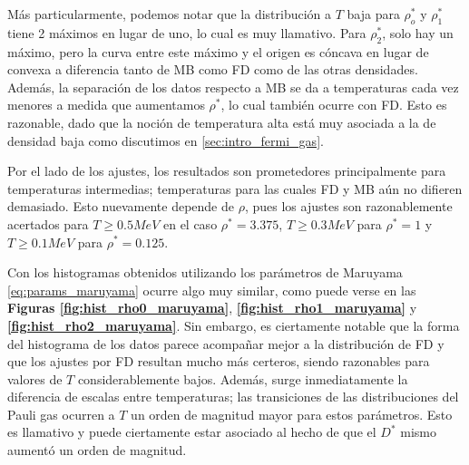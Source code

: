 Más particularmente, podemos notar que la distribución a $T$ baja para $\rho_o^*$ y $\rho_1^*$ tiene 2 máximos en lugar de uno, lo cual es muy llamativo.
Para $\rho_2^*$, solo hay un máximo, pero la curva entre este máximo y el origen es cóncava en lugar de convexa a diferencia tanto de MB como FD como de las otras densidades.
Además, la separación de los datos respecto a MB se da a temperaturas cada vez menores a medida que aumentamos $\rho^*$, lo cual también ocurre con FD.
Esto es razonable, dado que la noción de temperatura alta está muy asociada a la de densidad baja como discutimos en \ref{sec:intro_fermi_gas}.

Por el lado de los ajustes, los resultados son prometedores principalmente para temperaturas intermedias; temperaturas para las cuales FD y MB aún no difieren demasiado.
Esto nuevamente depende de $\rho$, pues los ajustes son razonablemente acertados para $T\geq 0.5MeV$ en el caso $\rho^*=3.375$, $T\geq 0.3MeV$ para $\rho^*=1$ y $T\geq 0.1MeV$ para $\rho^*=0.125$.

Con los histogramas obtenidos utilizando los parámetros de Maruyama \eqref{eq:params_maruyama} ocurre algo muy similar, como puede verse en las \textbf{Figuras \ref{fig:hist_rho0_maruyama}}, 
\textbf{\ref{fig:hist_rho1_maruyama}} y \textbf{\ref{fig:hist_rho2_maruyama}}.
Sin embargo, es ciertamente notable que la forma del histograma de los datos parece acompañar mejor a la distribución de FD y que los ajustes por FD resultan mucho más certeros, siendo
razonables para valores de $T$ considerablemente bajos.
Además, surge inmediatamente la diferencia de escalas entre temperaturas; las transiciones de las distribuciones del Pauli gas ocurren a $T$ un orden de magnitud mayor para estos parámetros.
Esto es llamativo y puede ciertamente estar asociado al hecho de que el $D^*$ mismo aumentó un orden de magnitud.

